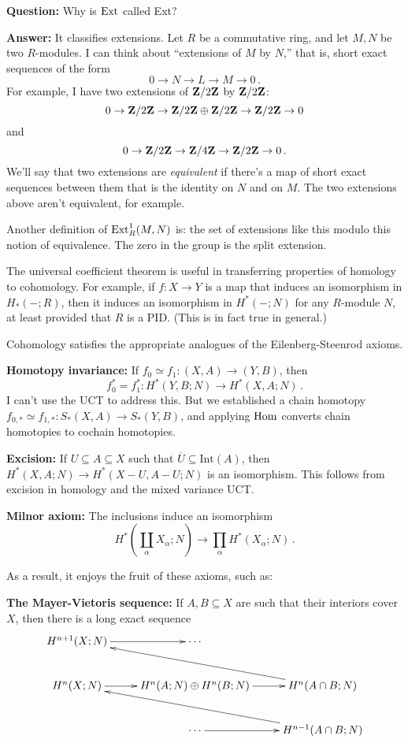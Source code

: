 \begin{remark}
\textbf{Question:} Why is $\operatorname{Ext}$ called Ext?

\noindent
\textbf{Answer:} It classifies extensions. Let $R$ be a commutative ring, and let $M,N$ be two $R$-modules. I can think about ``extensions of $M$ by $N$,''
that is, short exact sequences of the form
\[
0\to N\to L\to M\to 0\,.
\]
For example, I have two extensions of $\mathbf Z/2\mathbf Z$ by $\mathbf Z/2\mathbf Z$: 
\[
0\to\mathbf Z/2\mathbf Z\to\mathbf Z/2\mathbf Z\oplus\mathbf Z/2\mathbf Z\to\mathbf Z/2\mathbf Z\to 0
\]
and
\[0\to \mathbf Z/2\mathbf Z\to\mathbf Z/4\mathbf Z\to\mathbf Z/2\mathbf Z\to 0\,.
\]
We'll say that two extensions are {\em equivalent} if there's a map of short exact sequences between them that is the identity on $N$ and on $M$. The two extensions above aren't equivalent, for example.

Another definition of $\operatorname{Ext}^1_R(M,N)$ is: the set of extensions like this modulo this notion of equivalence. The zero in the group is the split extension.
\end{remark}

The universal coefficient theorem is useful in transferring properties of 
homology to cohomology. For example, if $f:X\to Y$ is a map that induces an
isomorphism in $H_*(-;R)$, then it induces an isomorphism in $H^*(-;N)$ for
any $R$-module $N$, at least provided that $R$ is a PID. (This is in fact 
true in general.) 

Cohomology satisfies the appropriate analogues of the Eilenberg-Steenrod axioms.

\noindent
\textbf{Homotopy invariance:}
If $f_0\simeq f_1:(X,A)\to (Y,B)$, then 
\[
f_0^*=f_1^*:H^\ast(Y,B;N)\to H^\ast(X,A;N)\,.
\]
I can't use the UCT to address this. But we established a chain homotopy $f_{0,\ast}\simeq f_{1,\ast}:S_\ast(X,A)\to S_\ast(Y,B)$, and applying $\operatorname{Hom}$ converts chain homotopies to cochain homotopies. 

\noindent
\textbf{Excision:} If $U\subseteq A\subseteq X$ such that $\overline{U}\subseteq\mathrm{Int}(A)$, then $ H^\ast(X,A;N)\to H^\ast(X-U,A-U;N)$ is an isomorphism. This follows from excision in homology and the mixed variance UCT.

\noindent
\textbf{Milnor axiom:} The inclusions induce an isomorphism
\[
H^*(\coprod_\alpha X_\alpha;N)\to \prod_\alpha H^*(X_\alpha;N)\,.
\]

As a result, it enjoys the fruit of these axioms, such as:

\noindent
\textbf{The Mayer-Vietoris sequence:} If $A,B\subseteq X$ are such that their interiors cover $X$, then there is a long exact sequence
\begin{equation*}
\xymatrix{ 
 H^{n+1}(X;N)\ar[r] & \cdots \\
 H^n(X;N)\ar[r] & H^n(A;N)\oplus H^n(B;N)\ar[r] & H^n(A\cap B;N)\ar[ull]\\
& \cdots \ar[r] & H^{n-1}(A\cap B;N) \ar[ull]
}
\end{equation*}







